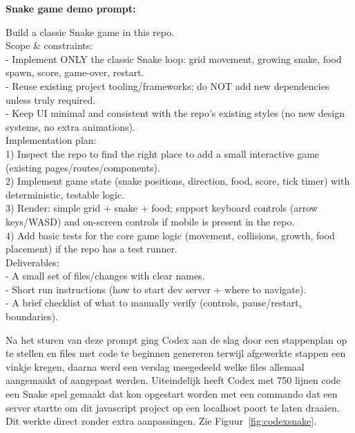 \textbf{Snake game demo prompt:}
\begin{tcolorbox}[colback=gray!20, colframe=gray!80]
    Build a classic Snake game in this repo.\\
    
    Scope \& constraints:\\
    - Implement ONLY the classic Snake loop: grid movement, growing snake, food spawn, score, game-over, restart.\\
    - Reuse existing project tooling/frameworks; do NOT add new dependencies unless truly required.\\
    - Keep UI minimal and consistent with the repo’s existing styles (no new design systems, no extra animations).\\
    
    Implementation plan:\\
    1) Inspect the repo to find the right place to add a small interactive game (existing pages/routes/components).\\
    2) Implement game state (snake positions, direction, food, score, tick timer) with deterministic, testable logic.\\
    3) Render: simple grid + snake + food; support keyboard controls (arrow keys/WASD) and on-screen controls if mobile is present in the repo.\\
    4) Add basic tests for the core game logic (movement, collisions, growth, food placement) if the repo has a test runner.\\
    
    Deliverables:\\
    - A small set of files/changes with clear names.\\
    - Short run instructions (how to start dev server + where to navigate).\\
    - A brief checklist of what to manually verify (controls, pause/restart, boundaries).
    
\end{tcolorbox}

Na het sturen van deze prompt ging Codex aan de slag door een stappenplan op te stellen en files met code te beginnen genereren terwijl afgewerkte stappen een vinkje kregen, daarna werd een verslag meegedeeld welke files allemaal aangemaakt of aangepast werden. Uiteindelijk heeft Codex met 750 lijnen code een Snake spel gemaakt dat kon opgestart worden met een commando dat een server startte om dit javascript project op een localhost poort te laten draaien. Dit werkte direct zonder extra aanpassingen. Zie Figuur~\ref{fig:codexsnake}.

